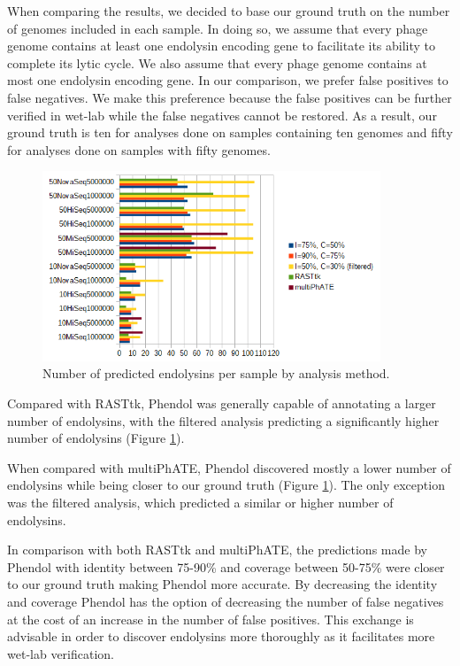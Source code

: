 When comparing the results, we decided to base our ground truth on the number of genomes included in each sample. In doing so, we assume that every phage genome contains at least one endolysin encoding gene to facilitate its ability to complete its lytic cycle. We also assume that every phage genome contains at most one endolysin encoding gene. In our comparison, we prefer false positives to false negatives. We make this preference because the false positives can be further verified in wet-lab while the false negatives cannot be restored. As a result, our ground truth is ten for analyses done on samples containing ten genomes and fifty for analyses done on samples with fifty genomes.

\begin{figure}[h]
  \begin{center}
     \includegraphics[width=0.9\textwidth]{images/results.png}
     \caption{Number of predicted endolysins per sample by analysis method.}\label{fig:results}
  \end{center}
\end{figure} 

Compared with RASTtk, Phendol was generally capable of annotating a larger number of endolysins, with the filtered analysis predicting a significantly higher number of endolysins (Figure \ref{fig:results}). 

When compared with multiPhATE, Phendol discovered mostly a lower number of endolysins while being closer to our ground truth (Figure \ref{fig:results}). The only exception was the filtered analysis, which predicted a similar or higher number of endolysins.

In comparison with both RASTtk and multiPhATE, the predictions made by Phendol with identity between 75-90\% and coverage between 50-75\% were closer to our ground truth making Phendol more accurate. By decreasing the identity and coverage Phendol has the option of decreasing the number of false negatives at the cost of an increase in the number of false positives. This exchange is advisable in order to discover endolysins more thoroughly as it facilitates more wet-lab verification.
